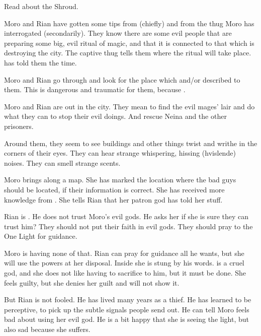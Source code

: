Read about the Shroud. 

Moro and Rian have gotten some tips from \Nasshikerr (chiefly) and from the thug Moro has interrogated (secondarily).
They know there are some evil people that are preparing some big, evil ritual of magic, and that it is connected to that which is destroying the city.
The captive thug tells them where the ritual will take place. 
\Nasshikerr has told them the time. 

Moro and Rian go through \Malcur and look for the place which  and/or  described to them. 
This is dangerous and traumatic for them, because . 

\begin{comment}
  \section{Rian doubts Moro and her god}
\end{comment}
Moro and Rian are out in the city. 
They mean to find the evil mages' lair and do what they can to stop their evil doings. 
And rescue Neina and the other prisoners.

Around them, they seem to see buildings and other things twist and writhe in the corners of their eyes. 
They can hear strange whispering, hissing (hvislende) noises.
They can smell strange scents. 

Moro brings along a map.
She has marked the location where the bad guys should be located, if their information is correct. 
She has received more knowledge from \Nasshikerr.
She tells Rian that her patron god has told her stuff. 

Rian is \skeptical. 
He does not trust Moro's evil gods. 
He asks her if she is sure they can trust him?
They should not put their faith in evil gods. 
They should pray to the One Light for guidance. 

Moro is having none of that.
Rian can pray for guidance all he wants, but she will use the powers at her disposal. 
Inside she is stung by his words.
\Nasshikerr is a cruel god, and she does not like having to sacrifice to him, but it must be done. 
She feels guilty, but she denies her guilt and will not show it. 

But Rian is not fooled. 
He has lived many years as a thief.
He has learned to be perceptive, to pick up the subtle signals people send out.
He can tell Moro feels bad about using her evil god.
He is a bit happy that she is seeing the light, but also sad because she suffers. 

